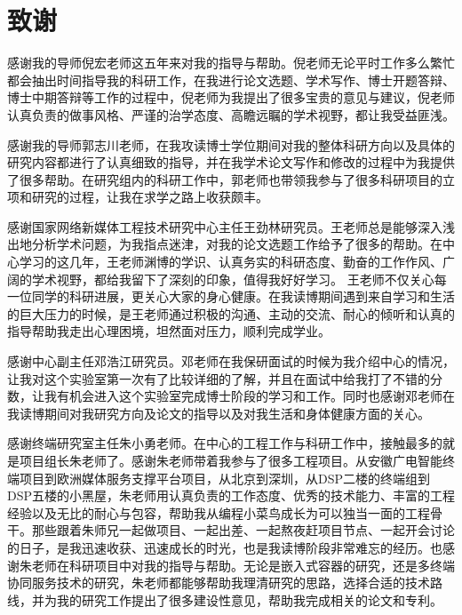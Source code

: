 \chapter[致谢]{致\quad 谢}%
\thispagestyle{noheaderstyle}%


感谢我的导师倪宏老师这五年来对我的指导与帮助。倪老师无论平时工作多么繁忙都会抽出时间指导我的科研工作，在我进行论文选题、学术写作、博士开题答辩、博士中期答辩等工作的过程中，倪老师为我提出了很多宝贵的意见与建议，倪老师认真负责的做事风格、严谨的治学态度、高瞻远瞩的学术视野，都让我受益匪浅。

感谢我的导师郭志川老师，在我攻读博士学位期间对我的整体科研方向以及具体的研究内容都进行了认真细致的指导，并在我学术论文写作和修改的过程中为我提供了很多帮助。在研究组内的科研工作中，郭老师也带领我参与了很多科研项目的立项和研究的过程，让我在求学之路上收获颇丰。

感谢国家网络新媒体工程技术研究中心主任王劲林研究员。王老师总是能够深入浅出地分析学术问题，为我指点迷津，对我的论文选题工作给予了很多的帮助。在中心学习的这几年，王老师渊博的学识、认真务实的科研态度、勤奋的工作作风、广阔的学术视野，都给我留下了深刻的印象，值得我好好学习。
王老师不仅关心每一位同学的科研进展，更关心大家的身心健康。在我读博期间遇到来自学习和生活的巨大压力的时候，是王老师通过积极的沟通、主动的交流、耐心的倾听和认真的指导帮助我走出心理困境，坦然面对压力，顺利完成学业。

感谢中心副主任邓浩江研究员。邓老师在我保研面试的时候为我介绍中心的情况，让我对这个实验室第一次有了比较详细的了解，并且在面试中给我打了不错的分数，让我有机会进入这个实验室完成博士阶段的学习和工作。同时也感谢邓老师在我读博期间对我研究方向及论文的指导以及对我生活和身体健康方面的关心。

感谢终端研究室主任朱小勇老师。在中心的工程工作与科研工作中，接触最多的就是项目组长朱老师了。感谢朱老师带着我参与了很多工程项目。从安徽广电智能终端项目到欧洲媒体服务支撑平台项目，从北京到深圳，从DSP二楼的终端组到DSP五楼的小黑屋，朱老师用认真负责的工作态度、优秀的技术能力、丰富的工程经验以及无比的耐心与包容，帮助我从编程小菜鸟成长为可以独当一面的工程骨干。那些跟着朱师兄一起做项目、一起出差、一起熬夜赶项目节点、一起开会讨论的日子，是我迅速收获、迅速成长的时光，也是我读博阶段非常难忘的经历。也感谢朱老师在科研项目中对我的指导与帮助。无论是嵌入式容器的研究，还是多终端协同服务技术的研究，朱老师都能够帮助我理清研究的思路，选择合适的技术路线，并为我的研究工作提出了很多建设性意见，帮助我完成相关的论文和专利。

